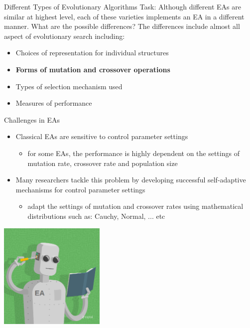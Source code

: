 \begin{frame}{Different Types of Evolutionary Algorithms}
Task: \hands [2min] \linebreak \linebreak
Although different EAs are similar at highest level, each of these varieties implements an EA in a different manner. What are the possible differences? \linebreak
The differences include almost all aspect of evolutionary search including:
\begin{itemize}
    \item Choices of representation for individual structures
    \item \textbf{Forms of mutation and crossover operations}
    \item Types of selection mechanism used
    \item Measures of performance
\end{itemize}
\end{frame}

\begin{frame}{Challenges in EAs}
\begin{itemize}
    \item Classical EAs are sensitive to control parameter settings
    \begin{itemize}
        \item for some EAs, the performance is highly dependent on the settings of mutation rate, crossover rate and population size 
    \end{itemize}
    \item Many researchers tackle this problem by developing successful \alert{self-adaptive mechanisms} for control parameter settings 
    \begin{itemize}
        \item adapt the settings of mutation and crossover rates using mathematical distributions such as: Cauchy, Normal, ... etc 
    \end{itemize}
\end{itemize}
\begin{center}
\includegraphics[width=0.38\textwidth]{new_images/EAc.png}
\end{center}    
\end{frame}

